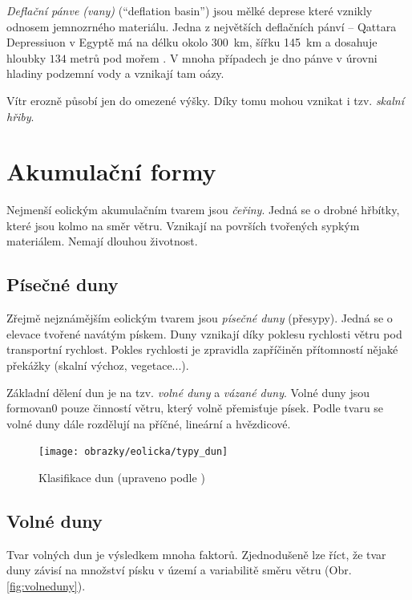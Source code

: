 \emph{Deflační pánve (vany)} (\enquote{deflation basin}) jsou mělké deprese které vznikly odnosem jemnozrného materiálu. Jedna z největších deflačních pánví -- Qattara Depressiuon v Egyptě má na délku okolo \SI{300}{\kilo\metre}, šířku \SI{145}{\kilo\metre} a dosahuje hloubky $134$ metrů pod mořem \parencite{albrittonOriginQattaraDepression1990}. V mnoha případech je dno pánve v úrovni hladiny podzemní vody a vznikají tam oázy. 

Vítr erozně působí jen do omezené výšky. Díky tomu mohou vznikat i tzv. \emph{skalní hřiby}.

\section{Akumulační formy}
Nejmenší eolickým akumulačním tvarem jsou \emph{čeřiny}. Jedná se o drobné hřbítky, které jsou kolmo na směr větru. Vznikají na površích tvořených sypkým materiálem. Nemají dlouhou životnost. 

\subsection{Písečné duny}
Zřejmě nejznámějším eolickým tvarem jsou \emph{písečné duny} (přesypy). Jedná se o elevace tvořené navátým pískem. Duny vznikají díky poklesu rychlosti větru pod transportní rychlost. Pokles rychlosti je zpravidla zapříčiněn přítomností nějaké překážky (skalní výchoz, vegetace...). 

Základní dělení dun je na tzv. \emph{volné duny} a \emph{vázané duny}. Volné duny jsou formovan0 pouze činností větru, který volně přemisťuje písek. Podle tvaru se volné duny dále rozdělují na příčné, lineární a hvězdicové. 

\begin{figure}
	\centering
	\texttt{[image: obrazky/eolicka/typy\_dun]}
	\caption{Klasifikace dun (upraveno podle \textcite{livingstoneAeolianGeomorphologyNew2019})}
	\label{fig:typdun}
\end{figure}

\subsection{Volné duny}
Tvar volných dun je výsledkem mnoha faktorů. Zjednodušeně lze říct, že tvar duny závisí na množství písku v území a variabilitě směru větru (Obr. \ref{fig:volneduny}). 


